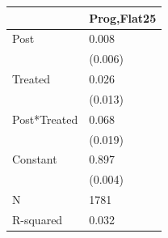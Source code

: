 \begin{tabular}{ll}
\toprule
 & Prog,Flat25 \\
\midrule
Post & 0.008 \\
 & (0.006) \\
Treated & 0.026 \\
 & (0.013) \\
Post*Treated & 0.068 \\
 & (0.019) \\
Constant & 0.897 \\
 & (0.004) \\
N & 1781 \\
R-squared & 0.032 \\
\bottomrule
\end{tabular}
